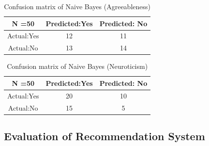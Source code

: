 \begin{table}[!ht]
\centering
\begin{tabular}{ |c|c|c| }
 \hline
 N =50 & Predicted:Yes & Predicted: No \\
 \hline
 Actual:Yes&12 & 11 \\
 \hline
 Actual:No&13 & 14 \\
 \hline
\end{tabular}
 \caption{Confusion matrix of Naive Bayes (Agreeableness)}
\end{table}

\begin{table}[!ht]
\centering
\begin{tabular}{ |c|c|c| }
 \hline
 N =50 & Predicted:Yes & Predicted: No \\
 \hline
 Actual:Yes&20 & 10 \\
 \hline
 Actual:No&15 & 5 \\
 \hline
\end{tabular}
 \caption{Confusion matrix of Naive Bayes (Neuroticism)}
\end{table}


\subsection{Evaluation of Recommendation System}

